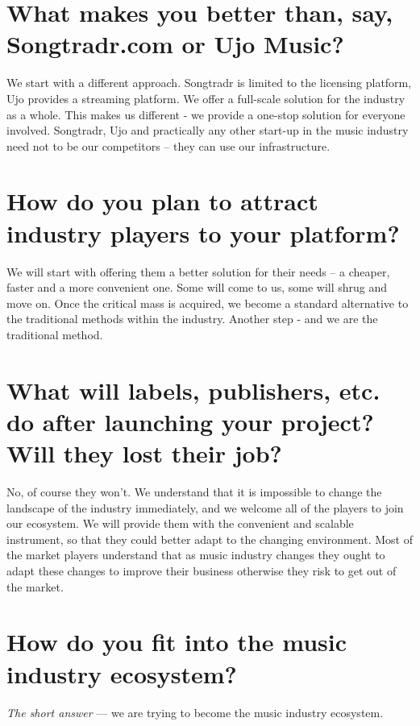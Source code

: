 \documentclass[12pt]{report}
\begin{document}
\section{What makes you better than, say, Songtradr.com or Ujo Music?}
\label{project-competitors}
We start with a different approach. Songtradr is limited to the licensing platform, Ujo provides a streaming platform. We offer a full-scale solution for the industry as a whole. This makes us different - we provide a one-stop solution for everyone involved. Songtradr, Ujo and practically any other start-up in the music industry need not to be our competitors – they can use our infrastructure.

\section{How do you plan to attract industry players to your platform?}
\label{project-attract}
We will start with offering them a better solution for their needs – a cheaper, faster and a more convenient one. Some will come to us, some will shrug and move on. Once the critical mass is acquired, we become a standard alternative to the traditional methods within the industry. Another step - and we are the traditional method.

\section{What will labels, publishers, etc. do after launching your project? Will they lost their job?}
\label{project-labels}
No, of course they won’t. We understand that it is impossible to change the landscape of the industry immediately, and we welcome all of the players to join our ecosystem. We will provide them with the convenient and scalable instrument, so that they could better adapt to the changing environment. Most of the market players understand that as music industry changes they ought to adapt these changes to improve their business otherwise they risk to get out of the market.

\section{How do you fit into the music industry ecosystem?}
\label{project-industry}
\textit{The short answer} — we are trying to become the music industry ecosystem.
\end{document}
